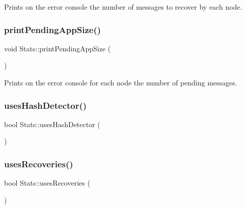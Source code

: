 Prints on the error console the number of messages to recover by each node. 

\mbox{\label{class_stats_a5b65312e84788b3fe5e19c8e535a03f4}} 
\subsubsection{\texorpdfstring{print\+Pending\+App\+Size()}{printPendingAppSize()}}
{\footnotesize\ttfamily void Stats\+::print\+Pending\+App\+Size (\begin{DoxyParamCaption}{ }\end{DoxyParamCaption})\hspace{0.3cm}{\ttfamily [private]}}



Prints on the error console for each node the number of pending messages. 

\mbox{\label{class_stats_a509d8e8fba4312eeffe2c6cee722f30f}} 
\subsubsection{\texorpdfstring{uses\+Hash\+Detector()}{usesHashDetector()}}
{\footnotesize\ttfamily bool Stats\+::uses\+Hash\+Detector (\begin{DoxyParamCaption}{ }\end{DoxyParamCaption})\hspace{0.3cm}{\ttfamily [private]}}

\mbox{\label{class_stats_a876b1b2674fb82cb45b6bc4b094019ae}} 
\subsubsection{\texorpdfstring{uses\+Recoveries()}{usesRecoveries()}}
{\footnotesize\ttfamily bool Stats\+::uses\+Recoveries (\begin{DoxyParamCaption}{ }\end{DoxyParamCaption})\hspace{0.3cm}{\ttfamily [private]}}

